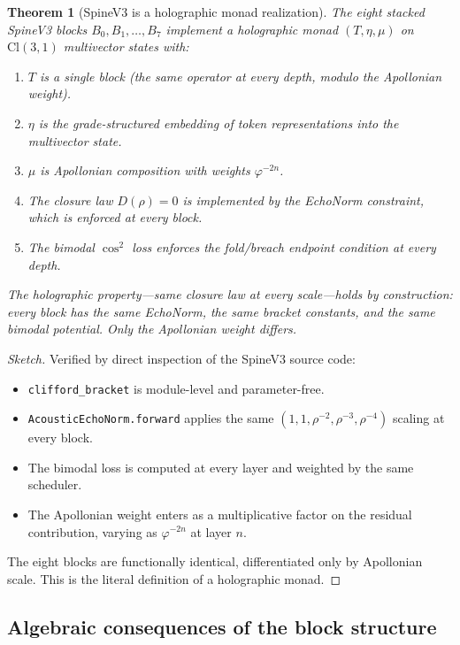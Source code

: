 \documentclass[11pt,a4paper]{article}
\theoremstyle{plain}
\newtheorem{theorem}{Theorem}[section]
\theoremstyle{definition}
\theoremstyle{remark}
\numberwithin{equation}{section}
\providecommand{\Cl}{\mathrm{Cl}}
\providecommand{\vp}{\varphi}
\begin{document}
\begin{theorem}[SpineV3 is a holographic monad realization]
\label{thm:spine-holographic}
The eight stacked SpineV3 blocks
$B_0, B_1, \ldots, B_7$ implement a holographic monad
$(T, \eta, \mu)$ on $\Cl(3,1)$ multivector states with:
\begin{enumerate}[label=\textnormal{(\arabic*)}]
\item $T$ is a single block (the same operator at every depth,
  modulo the Apollonian weight).
\item $\eta$ is the grade-structured embedding of token
  representations into the multivector state.
\item $\mu$ is Apollonian composition with weights $\vp^{-2n}$.
\item The closure law $D(\rho) = 0$ is implemented by the
  EchoNorm constraint, which is enforced at every block.
\item The bimodal $\cos^2$ loss enforces the fold/breach
  endpoint condition at every depth.
\end{enumerate}
The holographic property---same closure law at every
scale---holds by construction: every block has the same
EchoNorm, the same bracket constants, and the same bimodal
potential.  Only the Apollonian weight differs.
\end{theorem}

\begin{proof}[Sketch]
Verified by direct inspection of the SpineV3 source code:
\begin{itemize}[nosep]
\item \texttt{clifford\_bracket} is module-level and parameter-free.
\item \texttt{AcousticEchoNorm.forward} applies the same
  $(1, 1, \rho^{-2}, \rho^{-3}, \rho^{-4})$ scaling at every
  block.
\item The bimodal loss is computed at every layer and weighted
  by the same scheduler.
\item The Apollonian weight enters as a multiplicative factor on
  the residual contribution, varying as $\vp^{-2n}$ at layer $n$.
\end{itemize}
The eight blocks are functionally identical, differentiated only
by Apollonian scale.  This is the literal definition of a
holographic monad.
\end{proof}

\subsection{Algebraic consequences of the block structure}
\end{document}

